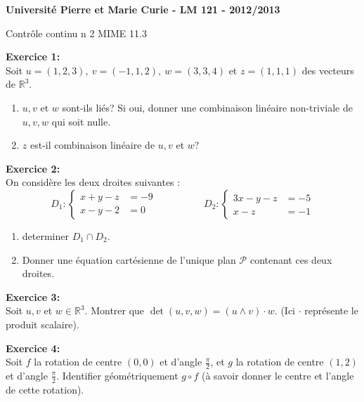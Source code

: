 \documentclass{article}
\newcommand{\R}{\mathbb{R}}
\begin{document}
\large
\noindent 
\textbf{Université Pierre et Marie Curie - LM 121 - 2012/2013}\\
\begin{center}
\Large 
Contrôle continu n 2 MIME 11.3
\end{center}
\medskip
\noindent
\textbf{Exercice 1:}\\
Soit $u=(1,2,3) , \ v=(-1,1,2) ,\ w=(3,3,4)$ et $z=(1,1,1)$ des vecteurs de $\mathbb{R}^3$. 
\begin{enumerate}
\item $u, v$ et $w$ sont-ils liés? Si oui, donner une combinaison linéaire non-triviale de 
$u,v,w$ qui soit nulle. 
\item $z$ est-il combinaison linéaire de $u,v$ et $w$?
\end{enumerate}




\medskip
\noindent
\textbf{Exercice 2:}\\
On considère les deux droites suivantes : 
\[
D_1 : 
\begin{cases}
x+y-z &=-9 \\
x-y-2 &=0
\end{cases} \hspace{2cm}
 D_2 : \begin{cases}
 3x-y-z&=-5 \\
 x-z &=-1 \end{cases}
 \]
 \begin{enumerate}
 \item determiner $D_1\cap D_2$.
 \item Donner une équation cartésienne de l'unique plan $\mathcal{P}$ contenant ces deux droites.
 \end{enumerate}





\medskip
\noindent
\textbf{Exercice 3:}\\
Soit $u,v$ et $w\in \R^3$. 
Montrer que 
$\det(u,v,w)= (u \wedge v)\cdot w$. (Ici $\cdot$ représente le produit scalaire).





\medskip
\noindent
\textbf{Exercice 4:}\\
Soit $f$ la rotation de centre $(0,0)$ et d'angle $\frac{\pi}{2}$, et $g$ la rotation de centre $(1,2)$ et d'angle $\frac{\pi}{2}$. Identifier géométriquement $g \circ f$ (à savoir donner le centre et l'angle de cette rotation).
\end{document}
